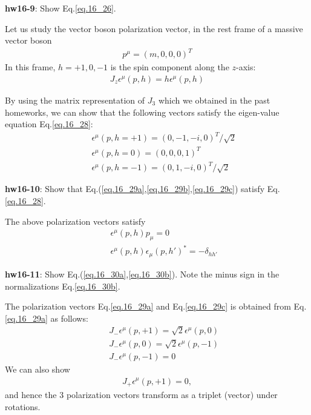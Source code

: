 \documentclass[12pt]{article}
\def\eps{\epsilon}
\begin{document}
{\bf hw16-9}: Show Eq.\ref{eq.16_26}.

Let us study the vector boson polarization vector, in the rest frame
of a massive vector boson
\begin{eqnarray}
  p^\mu = (m, 0, 0, 0)^T \label{eq.16_27}
\end{eqnarray}
In this frame, $h=+1, 0, -1$ is the spin component along the $z$-axis:
\begin{eqnarray}
  J_z \epsilon^\mu(p,h) = h \epsilon^\mu(p,h) \label{eq.16_28}
\end{eqnarray}

By using the matrix representation of $J_3$ which we obtained in the
past homeworks, we can show that the following vectors satisfy the
eigen-value equation Eq.\ref{eq.16_28}:
\begin{eqnarray} 
  && \eps^\mu(p,h=+1) = (0, -1, -i, 0)^T / \sqrt{2} \label{eq.16_29a} \\
  && \eps^\mu(p,h= 0) = (0,  0,  0, 1)^T \label{eq.16_29b} \\
  && \eps^\mu(p,h=-1) = (0,  1, -i, 0)^T / \sqrt{2} \label{eq.16_29c}
\end{eqnarray}

{\bf hw16-10}: Show that Eq.(\ref{eq.16_29a},\ref{eq.16_29b},\ref{eq.16_29c}) satisfy Eq.\ref{eq.16_28}.

The above polarization vectors satisfy
\begin{eqnarray}
&& \eps^\mu(p,h) p_\mu = 0 \label{eq.16_30a} \\
&& \eps^\mu(p,h) \eps_\mu(p,h')^* = -\delta_{hh'} \label{eq.16_30b}
\end{eqnarray}

{\bf hw16-11}: Show Eq.(\ref{eq.16_30a},\ref{eq.16_30b}). Note the minus sign in the normalizations Eq.\ref{eq.16_30b}.

The polarization vectors Eq.\ref{eq.16_29a} and Eq.\ref{eq.16_29c} is obtained from Eq.\ref{eq.16_29a} as follows:
\begin{eqnarray}
&& J_- \eps^\mu(p,+1) = \sqrt{2} \eps^\mu(p, 0) \label{eq.16_31a} \\
&& J_- \eps^\mu(p, 0) = \sqrt{2} \eps^\mu(p,-1) \label{eq.16_31b} \\
&& J_- \eps^\mu(p,-1) = 0 \label{eq.16_31c}
\end{eqnarray}
We can also show
\begin{eqnarray}
  J_+ \eps^\mu(p,+1) = 0, \label{eq.16_32}
\end{eqnarray}
and hence the $3$ polarization vectors transform as a triplet (vector)
under rotations.
\end{document}
